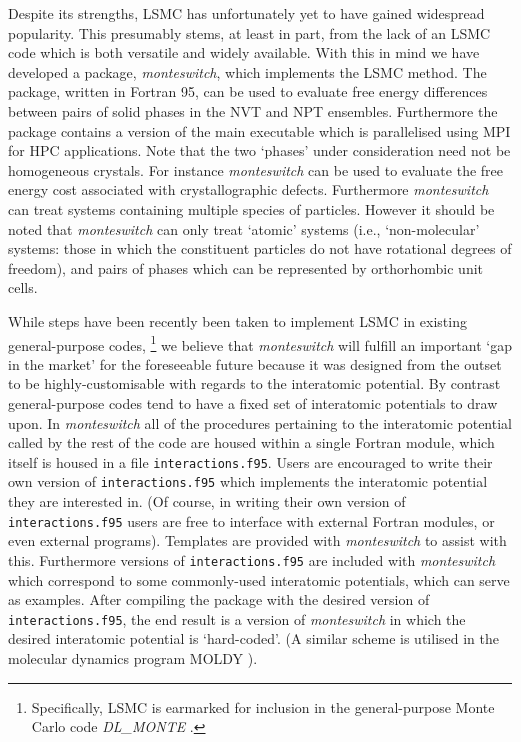 \documentclass{report}
\begin{document}
Despite its strengths, LSMC has unfortunately yet to have gained widespread popularity. This 
presumably stems, at least in part, from the lack of an LSMC code which is both versatile and widely available.
%
With this in mind we have developed a package, \emph{monteswitch}, which implements the LSMC method. The package, written in Fortran 95, can 
be used to evaluate free energy differences between pairs of solid phases in the NVT and NPT ensembles. Furthermore the
package contains a version of the main executable which is parallelised using MPI for HPC applications.
%
%
Note that the two `phases' under consideration need not be homogeneous crystals. For instance \emph{monteswitch} can be used to evaluate the 
free energy cost associated with crystallographic defects. Furthermore \emph{monteswitch} can treat systems containing multiple species of particles.
However it should be noted that \emph{monteswitch} can only treat `atomic' systems (i.e., `non-molecular' systems: those in which the constituent 
particles do not have rotational degrees of freedom), and pairs of phases which can be represented by orthorhombic unit cells.

While steps have been recently been taken to implement LSMC in existing general-purpose codes,
\footnote{Specifically, LSMC is earmarked for inclusion in the general-purpose Monte Carlo code \emph{DL\_MONTE} \cite{Purton_2013}.}
we believe that \emph{monteswitch} will fulfill
an important `gap in the market' for the foreseeable future because it was designed from the outset to be highly-customisable with regards to the 
interatomic potential. By contrast general-purpose codes tend to have a fixed set of interatomic potentials to draw upon.
In \emph{monteswitch} all of the procedures pertaining to the interatomic potential called by the rest of the code are housed within 
a single Fortran module, which itself is housed in a file \texttt{interactions.f95}. 
Users are encouraged to write their own version of \texttt{interactions.f95} which implements the interatomic potential they are interested in.
(Of course, in writing their own version of \texttt{interactions.f95} users are free to interface with external Fortran modules, or even external 
programs). 
Templates are provided with \emph{monteswitch} to assist with this. Furthermore versions of \texttt{interactions.f95} are included
with \emph{monteswitch} which correspond to some commonly-used interatomic potentials, which can serve as examples.
After compiling the package with the desired version of \texttt{interactions.f95}, the end result is a version of \emph{monteswitch} 
in which the desired interatomic potential is `hard-coded'.
(A similar scheme is utilised in the molecular dynamics program MOLDY \cite{Ackland_2011}).
\end{document}
